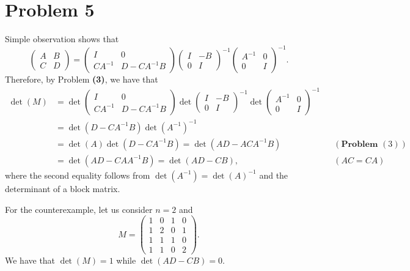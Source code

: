 \documentclass[11pt]{article}
\theoremstyle{plain}
\theoremstyle{definition}
\theoremstyle{remark}
\begin{document}
\section*{Problem 5}
Simple observation shows that
$$
    \begin{pmatrix}
        A & B
        \\ C & D
    \end{pmatrix} = 
    \begin{pmatrix}
        I & 0
        \\ CA^{-1} & D-CA^{-1}B
    \end{pmatrix}
    \begin{pmatrix}
        I & -B
        \\ 0 & I
    \end{pmatrix}^{-1}
    \begin{pmatrix}
        A^{-1} & 0
        \\ 0 & I
    \end{pmatrix}^{-1} .
$$
Therefore, by Problem \textbf{(3)}, we have that
\begin{align*}
    \det(M) &= \det\begin{pmatrix}
        I & 0
        \\ CA^{-1} & D-CA^{-1}B
    \end{pmatrix}
    \det\begin{pmatrix}
        I & -B
        \\ 0 & I
    \end{pmatrix}^{-1}
    \det \begin{pmatrix}
        A^{-1} & 0
        \\ 0 & I
    \end{pmatrix}^{-1}
    \\&= \det(D-CA^{-1}B)\det(A^{-1})^{-1}
    \\&= \det(A)\det(D-CA^{-1}B)
    =\det(AD-ACA^{-1}B) &&(\textbf{Problem }(3))
    \\&=\det(AD-CAA^{-1}B) = \det(AD-CB), &&(AC=CA)
\end{align*}
where the second equality follows from $\det(A^{-1}) = \det(A)^{-1}$ and the determinant of a block matrix. 

For the counterexample, let us consider $n = 2$ and
$$
    M = \begin{pmatrix}
          1& 0& 1& 0
        \\1& 2& 0& 1
        \\1& 1& 1& 0
        \\1& 1& 0& 2
    \end{pmatrix}.
$$
We have that $\det(M) = 1$ while $\det(AD-CB) = 0$.
\end{document}
